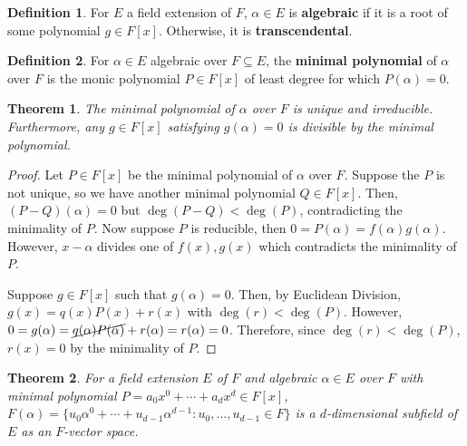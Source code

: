 \documentclass[parskip=half]{scrartcl}  %
\theoremstyle{definition}
\newtheorem{definition}{Definition}[section]
\theoremstyle{plain}
\newtheorem{theorem}{Theorem}[definition]
\theoremstyle{remark}
\begin{document}
\begin{definition}
    For $E$ a field extension of $F$, $\alpha\in E$ is \textbf{algebraic} if it is a root of some
    polynomial $g\in F[x]$.
    Otherwise, it is \textbf{transcendental}.
\end{definition}

\begin{definition}
    For $\alpha\in E$ algebraic over $F\subseteq E$, the \textbf{minimal polynomial} of
    $\alpha$ over $F$ is the monic polynomial $P\in F[x]$ of least degree for which $P(\alpha)=0$.
\end{definition}

\begin{theorem}
    \label{thm:minimal polynomial is unique and irreducible}
    The minimal polynomial of $\alpha$ over $F$ is unique and irreducible.
    Furthermore, any $g\in F[x]$ satisfying $g(\alpha)=0$ is divisible by the minimal polynomial.
\end{theorem}

\begin{proof}
    Let $P\in F[x]$ be the minimal polynomial of $\alpha$ over $F$.
    Suppose the $P$ is not unique, so we have another minimal polynomial $Q\in F[x]$.
    Then, $(P-Q)(\alpha)=0$ but $\deg(P-Q)<\deg(P)$, contradicting the minimality of $P$.
    Now suppose $P$ is reducible, then $0=P(\alpha)=f(\alpha)g(\alpha)$.
    However, $x-\alpha$ divides one of $f(x),g(x)$ which contradicts the minimality of $P$.

    Suppose $g\in F[x]$ such that $g(\alpha)=0$.
    Then, by Euclidean Division, $g(x)=q(x)P(x)+r(x)$ with $\deg(r)<\deg(P)$.
    However, $0=g(\alpha)=\cancel{q(\alpha)P(\alpha)}+r(\alpha)=r(\alpha)=0$.
    Therefore, since $\deg(r)<\deg(P)$, $r(x)=0$ by the minimality of $P$.
\end{proof}

\begin{theorem}
    For a field extension $E$ of $F$ and algebraic $\alpha\in E$ over $F$ with minimal polynomial
    $P=a_0x^0+\cdots+a_dx^d\in F[x]$,
    $F(\alpha)=\{u_0\alpha^0+\cdots+u_{d-1}\alpha^{d-1}:u_0,\dots,u_{d-1}\in F\}$ is a
    $d$-dimensional subfield of $E$
    as an $F$-vector space.
\end{theorem}
\end{document}
